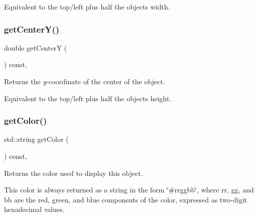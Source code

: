 Equivalent to the top/left plus half the object\textquotesingle{}s width. \mbox{\label{classsgl_1_1GObject_acb3287a3d507025a26f54b895713b947}} 
\subsubsection{\texorpdfstring{get\+Center\+Y()}{getCenterY()}}
{\footnotesize\ttfamily double get\+CenterY (\begin{DoxyParamCaption}{ }\end{DoxyParamCaption}) const\hspace{0.3cm}{\ttfamily [virtual]}, {\ttfamily [inherited]}}



Returns the {\itshape y}-\/coordinate of the center of the object. 

Equivalent to the top/left plus half the object\textquotesingle{}s height. \mbox{\label{classsgl_1_1GObject_aa061dfa488c31e18549d64363c1d0e34}} 
\subsubsection{\texorpdfstring{get\+Color()}{getColor()}}
{\footnotesize\ttfamily std\+::string get\+Color (\begin{DoxyParamCaption}{ }\end{DoxyParamCaption}) const\hspace{0.3cm}{\ttfamily [virtual]}, {\ttfamily [inherited]}}



Returns the color used to display this object. 

This color is always returned as a string in the form {\ttfamily \char`\"{}\#rrggbb\char`\"{}}, where {\ttfamily rr}, {\ttfamily gg}, and {\ttfamily bb} are the red, green, and blue components of the color, expressed as two-\/digit hexadecimal values. \mbox{\label{classsgl_1_1GObject_a76f6964a11fde7c78e9751be184e1a3c}} 
